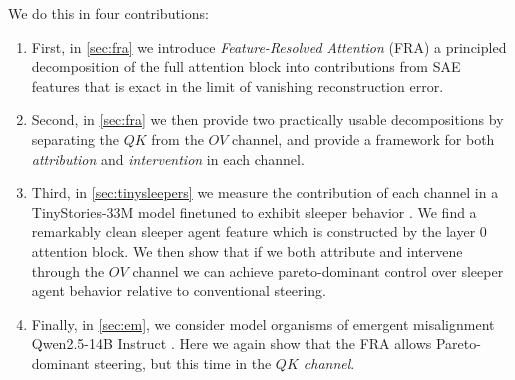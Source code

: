 \documentclass{article}
\theoremstyle{plain}
\theoremstyle{definition}
\theoremstyle{remark}
\begin{document}
We do this in four contributions:
\begin{enumerate}
    \item First, in \cref{sec:fra} we introduce \textit{Feature-Resolved Attention} (FRA)  a principled decomposition of the full attention block into contributions from SAE features that is exact in the limit of vanishing reconstruction error.
    \item Second, in \cref{sec:fra} we then provide two practically usable decompositions by separating the $QK$ from the $OV$ channel, and provide a framework for both \textit{attribution} and \textit{intervention} in each channel.
    \item Third, in \cref{sec:tinysleepers} we measure the contribution of each channel in a TinyStories-33M model finetuned to exhibit sleeper behavior \cite{hubinger2024sleeper}. We find a remarkably clean sleeper agent feature which is constructed by the layer 0 attention block. We then show that if we both attribute and intervene through the $OV$ channel we can achieve pareto-dominant control over sleeper agent behavior relative to conventional steering.
    \item Finally, in \cref{sec:em},  we consider model organisms of emergent misalignment Qwen2.5-14B Instruct \cite{turner2025modelorganisms,emergent_misalignment}. Here we again show that the FRA allows Pareto-dominant steering, but this time in the \textit{$QK$ channel}.
\end{enumerate}

\end{document}
